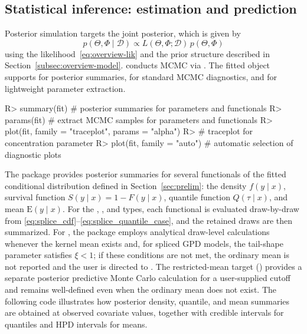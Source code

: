 \documentclass[article]{jss}\usepackage[]{graphicx}\usepackage[]{xcolor}
\renewenvironment{Schunk}{\vspace{0pt}}{\vspace{-0.1\baselineskip}}
\begin{document}
\subsection{Statistical inference: estimation and prediction}

Posterior simulation targets the joint posterior, which is given by
$$p(\Theta,\Phi\mid \mathcal{D}) \propto L(\Theta,\Phi;\mathcal{D})\,p(\Theta,\Phi)$$
using the likelihood~\eqref{eq:overview-lik} and the prior structure
described in Section~\ref{subsec:overview-model}.
 conducts MCMC via 
\citep{nimble_method,nimble_pkg}.  The fitted object supports  for
posterior summaries,  for standard MCMC diagnostics, and
 for lightweight parameter extraction.

\begin{Schunk}
\begin{Sinput}
R> summary(fit)  # posterior summaries for parameters and functionals
R> params(fit)   # extract MCMC samples for parameters and functionals
R> plot(fit,  family = "traceplot",  params = "alpha")
R> # traceplot for concentration parameter
R> plot(fit, family = "auto")  # automatic selection of diagnostic plots
\end{Sinput}
\end{Schunk}

The package provides posterior summaries for several functionals of the
fitted conditional distribution defined in
Section~\ref{sec:prelim}: the density $f(y\mid x)$, survival function
$S(y\mid x) = 1 - F(y\mid x)$, quantile function $Q(\tau\mid x)$,
and mean $\mathrm{E}(y\mid x)$.  For the ,
, and  types, each functional is
evaluated draw-by-draw from
\eqref{eq:splice_cdf}--\eqref{eq:splice_quantile_case}, and the
retained draws are then summarized.  For , the
package employs analytical draw-level calculations whenever the kernel
mean exists and, for spliced GPD models, the tail-shape parameter
satisfies $\xi < 1$; if these conditions are not met, the ordinary
mean is not reported and the user is directed to
.  The restricted-mean target
() provides a separate posterior predictive Monte
Carlo calculation for a user-supplied cutoff and remains well-defined
even when the ordinary mean does not exist.  The following code
illustrates how posterior density, quantile, and mean summaries are
obtained at observed covariate values, together with credible intervals
for quantiles and HPD intervals for means.
\end{document}
